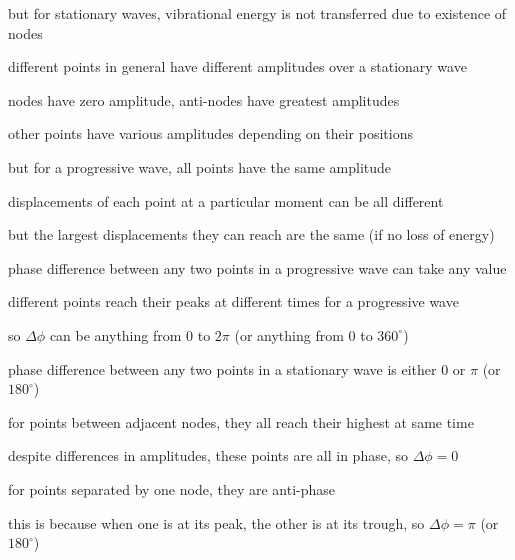 but for stationary waves, vibrational energy is not transferred due to existence of nodes

\cmt different points in general have different amplitudes over a stationary wave

\hspace*{1.25em} nodes have zero amplitude, anti-nodes have greatest amplitudes

\hspace*{1.25em} other points have various amplitudes depending on their positions

but for a progressive wave, all points have the same amplitude

\hspace*{1.25em} displacements of each point at a particular moment can be all different

\hspace*{1.25em} but the largest displacements they can reach are the same (if no loss of energy)

\cmt phase difference between any two points in a progressive wave can take any value

\hspace*{1.25em} different points reach their peaks at different times for a progressive wave

\hspace*{1.25em} so $\Delta \phi$ can be anything from 0 to $2\pi$ (or anything from 0 to $360^\circ$)

\cmt phase difference between any two points in a stationary wave is either 0 or $\pi$ (or $180^\circ$)

\hspace*{1.25em} for points between adjacent nodes, they all reach their highest at same time

\hspace*{1.25em} despite differences in amplitudes, these points are all in phase, so $\Delta \phi=0$

\hspace*{1.25em} for points separated by one node, they are anti-phase

this is because when one is at its peak, the other is at its trough, so $\Delta \phi = \pi$ (or $180^\circ$)





